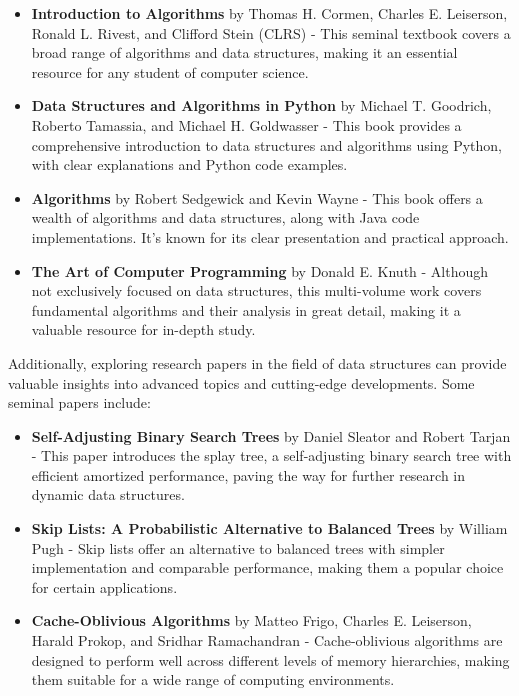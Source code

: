 \documentclass[12pt]{book} %
\begin{document}
\begin{itemize}
    \item \textbf{Introduction to Algorithms} by Thomas H. Cormen, Charles E. Leiserson, Ronald L. Rivest, and Clifford Stein (CLRS) - This seminal textbook covers a broad range of algorithms and data structures, making it an essential resource for any student of computer science.
    
    \item \textbf{Data Structures and Algorithms in Python} by Michael T. Goodrich, Roberto Tamassia, and Michael H. Goldwasser - This book provides a comprehensive introduction to data structures and algorithms using Python, with clear explanations and Python code examples.
    
    \item \textbf{Algorithms} by Robert Sedgewick and Kevin Wayne - This book offers a wealth of algorithms and data structures, along with Java code implementations. It's known for its clear presentation and practical approach.
    
    \item \textbf{The Art of Computer Programming} by Donald E. Knuth - Although not exclusively focused on data structures, this multi-volume work covers fundamental algorithms and their analysis in great detail, making it a valuable resource for in-depth study.
\end{itemize}

Additionally, exploring research papers in the field of data structures can provide valuable insights into advanced topics and cutting-edge developments. Some seminal papers include:

\begin{itemize}
    \item \textbf{Self-Adjusting Binary Search Trees} by Daniel Sleator and Robert Tarjan - This paper introduces the splay tree, a self-adjusting binary search tree with efficient amortized performance, paving the way for further research in dynamic data structures.
    
    \item \textbf{Skip Lists: A Probabilistic Alternative to Balanced Trees} by William Pugh - Skip lists offer an alternative to balanced trees with simpler implementation and comparable performance, making them a popular choice for certain applications.
    
    \item \textbf{Cache-Oblivious Algorithms} by Matteo Frigo, Charles E. Leiserson, Harald Prokop, and Sridhar Ramachandran - Cache-oblivious algorithms are designed to perform well across different levels of memory hierarchies, making them suitable for a wide range of computing environments.
\end{itemize}
\end{document}

